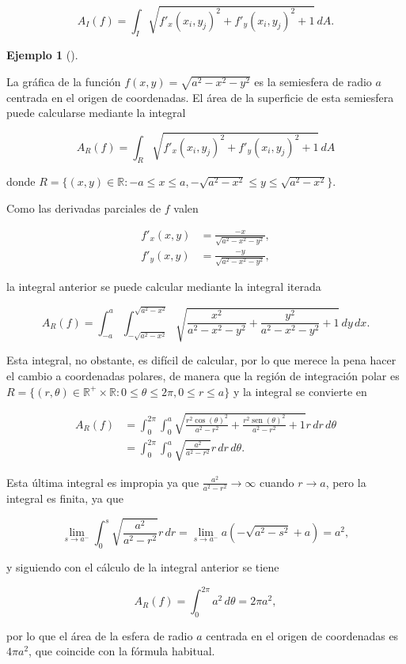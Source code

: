 \documentclass[
  a4paper,
]{scrreport}
\theoremstyle{plain}
\theoremstyle{definition}
\theoremstyle{plain}
\theoremstyle{plain}
\theoremstyle{definition}
\newtheorem{example}{Ejemplo}[chapter]
\theoremstyle{definition}
\theoremstyle{remark}
\begin{document}
\[
A_I(f) = \int_I \sqrt{f'_x(x_i,y_j)^2 + f'_y(x_i,y_j)^2 + 1}\,dA.
\]

\begin{example}[]\protect\hypertarget{exm-área-superficie-semi-esfera}{}\label{exm-área-superficie-semi-esfera}

La gráfica de la función \(f(x,y)=\sqrt{a^2-x^2-y^2}\) es la semiesfera
de radio \(a\) centrada en el origen de coordenadas. El área de la
superficie de esta semiesfera puede calcularse mediante la integral

\[
A_R(f) = \int_R \sqrt{f'_x(x_i,y_j)^2 + f'_y(x_i,y_j)^2 + 1}\,dA
\]

donde
\(R=\{(x,y)\in \mathbb{R}: -a\leq x\leq a, -\sqrt{a^2-x^2}\leq y\leq \sqrt{a^2-x^2}\}\).

Como las derivadas parciales de \(f\) valen

\begin{align*}
f'_x(x,y) &= \frac{-x}{\sqrt{a^2-x^2-y^2}}, \\
f'_y(x,y) &= \frac{-y}{\sqrt{a^2-x^2-y^2}},
\end{align*}

la integral anterior se puede calcular mediante la integral iterada

\[
A_R(f) = \int_{-a}^a \int_{-\sqrt{a^2-x^2}}^{\sqrt{a^2-x^2}} \sqrt{\frac{x^2}{a^2-x^2-y^2} + \frac{y^2}{a^2-x^2-y^2} + 1}\,dy\,dx.
\]

Esta integral, no obstante, es difícil de calcular, por lo que merece la
pena hacer el cambio a coordenadas polares, de manera que la región de
integración polar es
\(R=\{(r,\theta)\in \mathbb{R}^+\times \mathbb{R}: 0\leq \theta\leq 2\pi, 0\leq r\leq a\}\)
y la integral se convierte en

\begin{align*}
A_R(f) 
&= \int_0^{2\pi} \int_0^a \sqrt{\frac{r^2\cos(\theta)^2}{a^2-r^2}+\frac{r^2\operatorname{sen}(\theta)^2}{a^2-r^2}+1}r\,dr\,d\theta \\
&= \int_0^{2\pi} \int_0^a \sqrt{\frac{a^2}{a^2-r^2}}r\,dr\,d\theta.
\end{align*}

Esta última integral es impropia ya que
\(\frac{a^2}{a^2-r^2}\to \infty\) cuando \(r\to a\), pero la integral es
finita, ya que

\[
\lim_{s\to a^-}\int_0^s \sqrt{\frac{a^2}{a^2-r^2}} r\,dr
= \lim_{s\to a^-} a(-\sqrt{a^2-s^2}+a) = a^2,
\]

y siguiendo con el cálculo de la integral anterior se tiene

\[
A_R(f)
= \int_0^{2\pi} a^2\,d\theta
= 2\pi a^2,
\]

por lo que el área de la esfera de radio \(a\) centrada en el origen de
coordenadas es \(4\pi a^2\), que coincide con la fórmula habitual.

\end{example}
\end{document}
